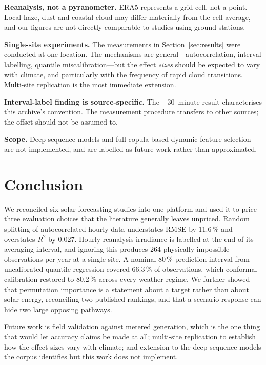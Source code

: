 \documentclass[conference]{IEEEtran}
\begin{document}
\textbf{Reanalysis, not a pyranometer.} ERA5 represents a grid cell,
not a point. Local haze, dust and coastal cloud may differ materially
from the cell average, and our figures are not directly comparable to
studies using ground stations.

\textbf{Single-site experiments.} The measurements in
Section~\ref{sec:results} were conducted at one location. The
mechanisms are general---autocorrelation, interval labelling, quantile
miscalibration---but the effect \emph{sizes} should be expected to vary
with climate, and particularly with the frequency of rapid cloud
transitions. Multi-site replication is the most immediate extension.

\textbf{Interval-label finding is source-specific.} The $-30$~minute
result characterises this archive's convention. The measurement
procedure transfers to other sources; the offset should not be assumed
to.

\textbf{Scope.} Deep sequence models \cite{P6} and full copula-based
dynamic feature selection \cite{P3} are not implemented, and are
labelled as future work rather than approximated.

\section{Conclusion}

We reconciled six solar-forecasting studies into one platform and used
it to price three evaluation choices that the literature generally
leaves unpriced. Random splitting of autocorrelated hourly data
understates RMSE by 11.6\,\% and overstates $R^{2}$ by 0.027. Hourly
reanalysis irradiance is labelled at the end of its averaging interval,
and ignoring this produces 264 physically impossible observations per
year at a single site. A nominal 80\,\% prediction interval from
uncalibrated quantile regression covered 66.3\,\% of observations,
which conformal calibration restored to 80.2\,\% across every weather
regime. We further showed that permutation importance is a statement
about a target rather than about solar energy, reconciling two
published rankings, and that a scenario response can hide two large
opposing pathways.

Future work is field validation against metered generation, which is
the one thing that would let accuracy claims be made at all;
multi-site replication to establish how the effect sizes vary with
climate; and extension to the deep sequence models the corpus
identifies but this work does not implement.
\end{document}
